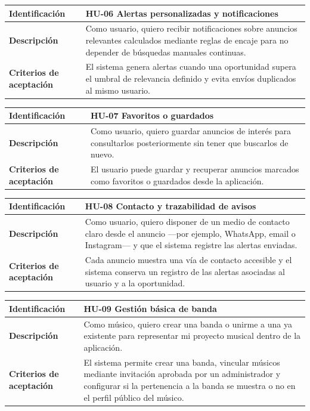 \documentclass[12pt,a4paper]{report}
\begin{document}
\begin{center}
\begin{tabular}{|L{2.9cm}|L{10cm}|}
\hline
\textbf{Identificación} & HU-06 Alertas personalizadas y notificaciones \\
\hline
\textbf{Descripción} & Como usuario, quiero recibir notificaciones sobre anuncios relevantes calculados mediante reglas de encaje para no depender de búsquedas manuales continuas. \\
\hline
\textbf{Criterios de aceptación} & El sistema genera alertas cuando una oportunidad supera el umbral de relevancia definido y evita envíos duplicados al mismo usuario. \\
\hline
\end{tabular}
\end{center}

\begin{center}
\begin{tabular}{|L{2.9cm}|L{10cm}|}
\hline
\textbf{Identificación} & HU-07 Favoritos o guardados \\
\hline
\textbf{Descripción} & Como usuario, quiero guardar anuncios de interés para consultarlos posteriormente sin tener que buscarlos de nuevo. \\
\hline
\textbf{Criterios de aceptación} & El usuario puede guardar y recuperar anuncios marcados como favoritos o guardados desde la aplicación. \\
\hline
\end{tabular}
\end{center}

\begin{center}
\begin{tabular}{|L{2.9cm}|L{10cm}|}
\hline
\textbf{Identificación} & HU-08 Contacto y trazabilidad de avisos \\
\hline
\textbf{Descripción} & Como usuario, quiero disponer de un medio de contacto claro desde el anuncio ---por ejemplo, WhatsApp, email o Instagram--- y que el sistema registre las alertas enviadas. \\
\hline
\textbf{Criterios de aceptación} & Cada anuncio muestra una vía de contacto accesible y el sistema conserva un registro de las alertas asociadas al usuario y a la oportunidad. \\
\hline
\end{tabular}
\end{center}

\begin{center}
\begin{tabular}{|L{2.9cm}|L{10cm}|}
\hline
\textbf{Identificación} & HU-09 Gestión básica de banda \\
\hline
\textbf{Descripción} & Como músico, quiero crear una banda o unirme a una ya existente para representar mi proyecto musical dentro de la aplicación. \\
\hline
\textbf{Criterios de aceptación} & El sistema permite crear una banda, vincular músicos mediante invitación aprobada por un administrador y configurar si la pertenencia a la banda se muestra o no en el perfil público del músico. \\
\hline
\end{tabular}
\end{center}
\end{document}
